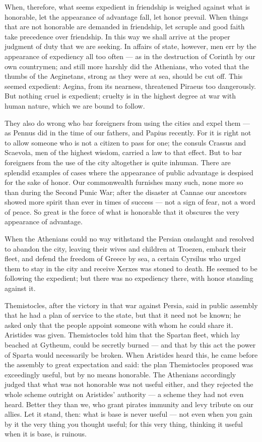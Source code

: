  When, therefore, what seems expedient in friendship is weighed against what is honorable, let the appearance of advantage fall, let honor prevail. When things that are not honorable are demanded in friendship, let scruple and good faith take precedence over friendship. In this way we shall arrive at the proper judgment of duty that we are seeking. In affairs of state, however, men err by the appearance of expediency all too often — as in the destruction of Corinth by our own countrymen; and still more harshly did the Athenians, who voted that the thumbs of the Aeginetans, strong as they were at sea, should be cut off. This seemed expedient: Aegina, from its nearness, threatened Piraeus too dangerously. But nothing cruel is expedient; cruelty is in the highest degree at war with human nature, which we are bound to follow.

 They also do wrong who bar foreigners from using the cities and expel them — as Pennus did in the time of our fathers, and Papius recently. For it is right not to allow someone who is not a citizen to pass for one; the consuls Crassus and Scaevola, men of the highest wisdom, carried a law to that effect. But to bar foreigners from the use of the city altogether is quite inhuman. There are splendid examples of cases where the appearance of public advantage is despised for the sake of honor. Our commonwealth furnishes many such, none more so than during the Second Punic War; after the disaster at Cannae our ancestors showed more spirit than ever in times of success — not a sign of fear, not a word of peace. So great is the force of what is honorable that it obscures the very appearance of advantage.

 When the Athenians could no way withstand the Persian onslaught and resolved to abandon the city, leaving their wives and children at Troezen, embark their fleet, and defend the freedom of Greece by sea, a certain Cyrsilus who urged them to stay in the city and receive Xerxes was stoned to death. He seemed to be following the expedient; but there was no expediency there, with honor standing against it.

 Themistocles, after the victory in that war against Persia, said in public assembly that he had a plan of service to the state, but that it need not be known; he asked only that the people appoint someone with whom he could share it. Aristides was given. Themistocles told him that the Spartan fleet, which lay beached at Gytheum, could be secretly burned — and that by this act the power of Sparta would necessarily be broken. When Aristides heard this, he came before the assembly to great expectation and said: the plan Themistocles proposed was exceedingly useful, but by no means honorable. The Athenians accordingly judged that what was not honorable was not useful either, and they rejected the whole scheme outright on Aristides' authority — a scheme they had not even heard. Better they than we, who grant pirates immunity and levy tribute on our allies. Let it stand, then: what is base is never useful — not even when you gain by it the very thing you thought useful; for this very thing, thinking it useful when it is base, is ruinous.

